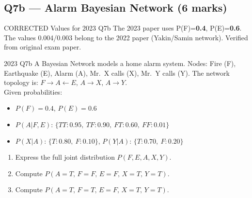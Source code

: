 \documentclass[12pt,a4paper]{article}
\begin{document}
\subsection{Q7b --- Alarm Bayesian Network (6 marks)}

\begin{warnbox}{CORRECTED Values for 2023 Q7b}
The 2023 paper uses P(F)=\textbf{0.4}, P(E)=\textbf{0.6}. The values 0.004/0.003 belong to the 2022 paper (Yakin/Samin network). Verified from original exam paper.
\end{warnbox}

\begin{qbox}{2023 Q7b}
A Bayesian Network models a home alarm system. Nodes: Fire (F), Earthquake (E), Alarm (A), Mr.\ X calls (X), Mr.\ Y calls (Y). The network topology is: $F \to A \leftarrow E$, $A \to X$, $A \to Y$.\\[4pt]
Given probabilities:
\begin{itemize}[noitemsep]
  \item $P(F)=0.4$, \quad $P(E)=0.6$
  \item $P(A|F,E)$: $\{TT: 0.95,\ TF: 0.90,\ FT: 0.60,\ FF: 0.01\}$
  \item $P(X|A)$: $\{T: 0.80,\ F: 0.10\}$, \quad $P(Y|A)$: $\{T: 0.70,\ F: 0.20\}$
\end{itemize}
\begin{enumerate}[label=(\roman*)]
  \item Express the full joint distribution $P(F,E,A,X,Y)$.
  \item Compute $P(A=T,\, F=F,\, E=F,\, X=T,\, Y=T)$.
  \item Compute $P(A=T,\, F=T,\, E=F,\, X=T,\, Y=T)$.
\end{enumerate}
\end{qbox}
\end{document}
